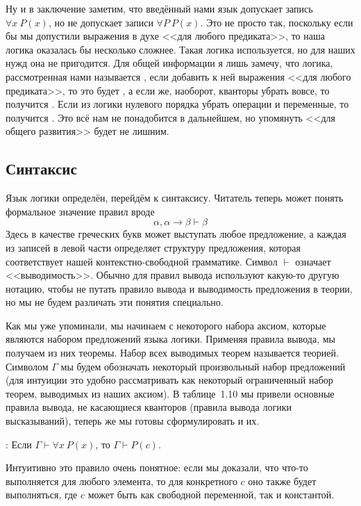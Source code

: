 Ну и в заключение заметим, что введённый нами язык допускает запись $\forall x\ P(x)$, но не допускает записи $\forall P\ P(x)$. Это не просто так, поскольку если бы мы допустили выражения в духе <<для любого предиката>>, то наша логика оказалась бы несколько сложнее. Такая логика используется, но для наших нужд она не пригодится. Для общей информации я лишь замечу, что логика, рассмотренная нами называется , если добавить к ней выражения <<для любого предиката>>, то это будет , а если же, наоборот, кванторы убрать вовсе, то получится . Если из логики нулевого порядка убрать операции и переменные, то получится . Это всё нам не понадобится в дальнейшем, но упомянуть <<для общего развития>> будет не лишним.

\subsection{Синтаксис}

Язык логики определён, перейдём к синтаксису. Читатель теперь может понять формальное значение правил вроде
$$\alpha, \alpha\to\beta \vdash \beta$$
Здесь в качестве греческих букв может выступать любое предложение, а каждая из записей в левой части определяет структуру предложения, которая соответствует нашей контекстно-свободной грамматике. Символ $\vdash$ означает <<выводимость>>. Обычно для правил вывода  используют какую-то другую нотацию, чтобы не путать правило вывода и выводимость предложения в теории, но мы не будем различать эти понятия специально.

Как мы уже упоминали, мы начинаем с некоторого набора аксиом, которые являются набором предложений языка логики. Применяя правила вывода, мы получаем из них теоремы. Набор всех выводимых теорем называется теорией. Символом $\Gamma$ мы будем обозначать некоторый произвольный набор предложений (для интуиции это удобно рассматривать как некоторый ограниченный набор теорем, выводимых из наших аксиом). В таблице~1.10 мы привели основные правила вывода, не касающиеся кванторов (правила вывода логики высказываний), теперь же мы готовы сформулировать и их.

: Если $\Gamma \vdash \forall x\ P(x)$, то $\Gamma \vdash P(c)$.

Интуитивно это правило очень понятное: если мы доказали, что что-то выполняется для любого элемента, то для конкретного $c$ оно также будет выполняться, где $c$ может быть как свободной переменной, так и константой.

